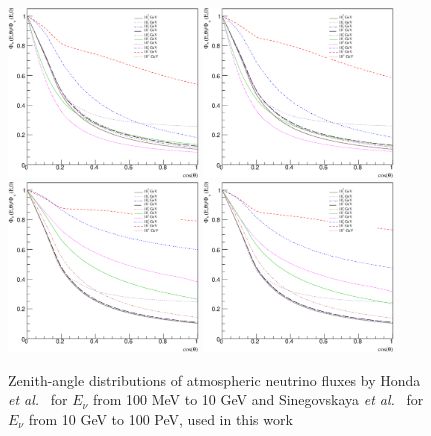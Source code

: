 \begin{figure}[htb!]
\begin{center}
\includegraphics[width=0.45\textwidth]{./AN/HGm_KM_ne_ZAD.eps}
\includegraphics[width=0.45\textwidth]{./AN/HGm_KM_ae_ZAD.eps}
\includegraphics[width=0.45\textwidth]{./AN/HGm_KM_nm_ZAD.eps}
\includegraphics[width=0.45\textwidth]{./AN/HGm_KM_am_ZAD.eps}
\caption{\label{ANZAD}Zenith-angle distributions of atmospheric neutrino fluxes by Honda \textit{et al.}~\cite{Honda:2011nf} for $E_{\nu}$ from 100 MeV to 10 GeV and Sinegovskaya \textit{et al.}~\cite{Sinegovskaya:2014pia} for $E_{\nu}$ from 10 GeV to 100 PeV, used in this work}
\end{center}
\end{figure}

